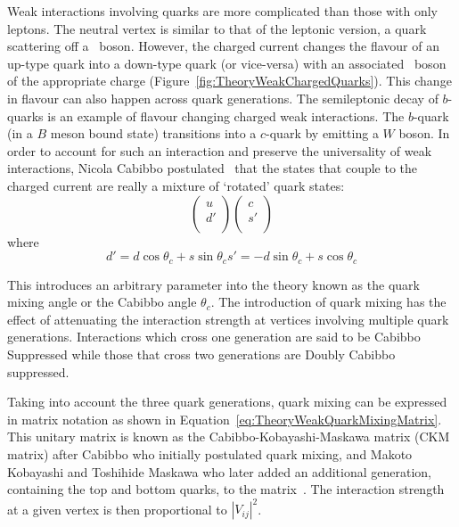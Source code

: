 Weak interactions involving quarks are more complicated than those with only leptons. The neutral vertex is similar to that of the leptonic version, a quark scattering off a \Z\ boson. However, the charged current changes the flavour of an up-type quark into a down-type quark (or vice-versa) with an associated \W\ boson of the appropriate charge (Figure~\ref{fig:TheoryWeakChargedQuarks}). This change in flavour can also happen across quark generations. The semileptonic decay of $b$-quarks is an example of flavour changing charged weak interactions. The $b$-quark (in a $B$ meson bound state) transitions into a $c$-quark by emitting a $W$ boson. In order to account for such an interaction and preserve the universality of weak interactions, Nicola Cabibbo postulated~\cite{Theory:CKMNicola} that the states that couple to the charged current are really a mixture of `rotated' quark states:
%
\begin{equation}
  \begin{pmatrix}
    u \\
    d' \\
  \end{pmatrix}
  \begin{pmatrix}
    c \\
    s' \\
  \end{pmatrix}
\end{equation}
%
where
%
\begin{subequations}
  \begin{equation}
  \label{eq:TheoryWeakQuarkMixingEq1}
  d'=d\cos\theta_{c} + s\sin\theta_{c}
  \end{equation}
  \begin{equation}
  \label{eq:TheoryWeakQuarkMixingEq2}
  s'=-d\sin\theta_{c} + s\cos\theta_{c}
  \end{equation}
\end{subequations}

This introduces an arbitrary parameter into the theory known as the quark mixing angle or the Cabibbo angle $\theta_{c}$. The introduction of quark mixing has the effect of attenuating the interaction strength at vertices involving multiple quark generations. Interactions which cross one generation are said to be Cabibbo Suppressed while those that cross two generations are Doubly Cabibbo suppressed.

Taking into account the three quark generations, quark mixing can be expressed in matrix notation as shown in Equation~\ref{eq:TheoryWeakQuarkMixingMatrix}. This unitary matrix is known as the Cabibbo-Kobayashi-Maskawa matrix (CKM matrix) after Cabibbo who initially postulated quark mixing, and Makoto Kobayashi and Toshihide Maskawa who later added an additional generation, containing the top and bottom quarks, to the matrix~\cite{Theory:CKMKobayashiMaskawa}. The interaction strength at a given vertex is then proportional to $|V_{ij}|^{2}$.

